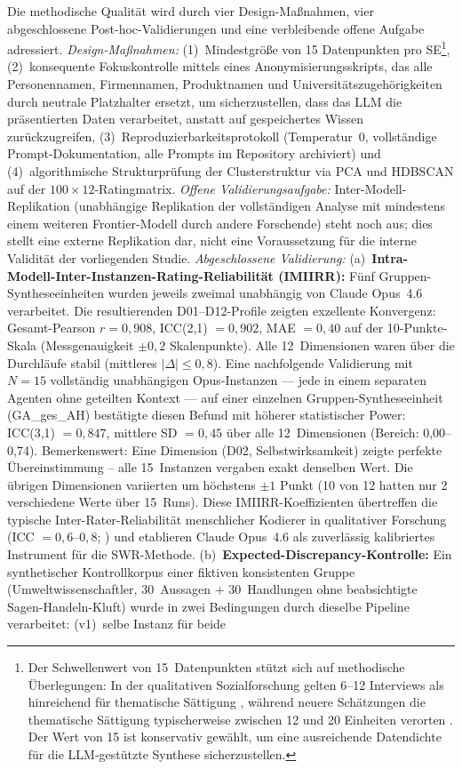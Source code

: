 \documentclass[12pt,a4paper]{article}
\begin{document}
Die methodische Qualit\"at wird durch vier Design-Ma\ss{}nahmen, vier abgeschlossene Post-hoc-Validierungen und eine verbleibende offene Aufgabe adressiert. \emph{Design-Ma\ss{}nahmen:} (1)~Mindestgr\"o\ss{}e von 15 Datenpunkten pro SE\footnote{Der Schwellenwert von 15~Datenpunkten st\"utzt sich auf methodische \"Uberlegungen: In der qualitativen Sozialforschung gelten 6--12 Interviews als hinreichend f\"ur thematische S\"attigung \citep{StraussCorbin1990}, w\"ahrend neuere Sch\"atzungen die thematische S\"attigung typischerweise zwischen 12 und 20 Einheiten verorten \citep{Guest2006, FugardPotts2015}. Der Wert von 15 ist konservativ gew\"ahlt, um eine ausreichende Datendichte f\"ur die LLM-gest\"utzte Synthese sicherzustellen.}, (2)~konsequente Fokuskontrolle mittels eines Anonymisierungsskripts, das alle Personennamen, Firmennamen, Produktnamen und Universit\"atszugeh\"origkeiten durch neutrale Platzhalter ersetzt, um sicherzustellen, dass das LLM die pr\"asentierten Daten verarbeitet, anstatt auf gespeichertes Wissen zur\"uckzugreifen, (3)~Reproduzierbarkeitsprotokoll (Temperatur~0, vollst\"andige Prompt-Dokumentation, alle Prompts im Repository archiviert) und (4)~algorithmische Strukturpr\"ufung der Clusterstruktur via PCA und HDBSCAN auf der $100 \times 12$-Ratingmatrix. \emph{Offene Validierungsaufgabe:} Inter-Modell-Replikation (unabh\"angige Replikation der vollst\"andigen Analyse mit mindestens einem weiteren Frontier-Modell durch andere Forschende) steht noch aus; dies stellt eine externe Replikation dar, nicht eine Voraussetzung f\"ur die interne Validit\"at der vorliegenden Studie. \emph{Abgeschlossene Validierung:} (a)~\textbf{Intra-Modell-Inter-Instanzen-Rating-Reliabilit\"at (IMIIRR):} F\"unf Gruppen-Syntheseeinheiten wurden jeweils zweimal unabh\"angig von Claude Opus~4.6 verarbeitet. Die resultierenden D01--D12-Profile zeigten exzellente Konvergenz: Gesamt-Pearson $r = 0{,}908$, ICC(2,1) $= 0{,}902$, MAE $= 0{,}40$ auf der 10-Punkte-Skala (Messgenauigkeit $\pm 0{,}2$ Skalenpunkte). Alle 12~Dimensionen waren \"uber die Durchl\"aufe stabil (mittleres $|\Delta| \leq 0{,}8$). Eine nachfolgende Validierung mit $N = 15$ vollst\"andig unabh\"angigen Opus-Instanzen --- jede in einem separaten Agenten ohne geteilten Kontext --- auf einer einzelnen Gruppen-Syntheseeinheit (GA\_ges\_AH) best\"atigte diesen Befund mit h\"oherer statistischer Power: ICC(3,1) $= 0{,}847$, mittlere SD $= 0{,}45$ \"uber alle 12~Dimensionen (Bereich: 0,00--0,74). Bemerkenswert: Eine Dimension (D02, Selbstwirksamkeit) zeigte perfekte \"Ubereinstimmung -- alle 15~Instanzen vergaben exakt denselben Wert. Die \"ubrigen Dimensionen variierten um h\"ochstens $\pm 1$ Punkt (10 von 12 hatten nur 2 verschiedene Werte \"uber 15~Runs). Diese IMIIRR-Koeffizienten \"ubertreffen die typische Inter-Rater-Reliabilit\"at menschlicher Kodierer in qualitativer Forschung (ICC $= 0{,}6$--$0{,}8$; \citealt{Hallgren2012}) und etablieren Claude Opus~4.6 als zuverl\"assig kalibriertes Instrument f\"ur die SWR-Methode. (b)~\textbf{Expected-Discrepancy-Kontrolle:} Ein synthetischer Kontrollkorpus einer fiktiven konsistenten Gruppe (Umweltwissenschaftler, 30~Aussagen + 30~Handlungen ohne beabsichtigte Sagen-Handeln-Kluft) wurde in zwei Bedingungen durch dieselbe Pipeline verarbeitet: (v1)~selbe Instanz f\"ur beide 
\end{document}
